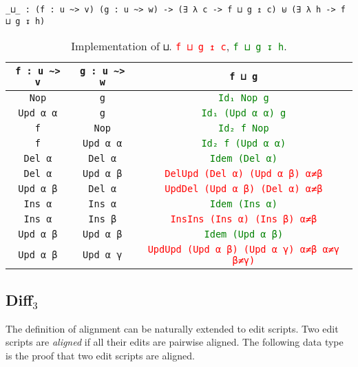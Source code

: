 \documentclass[../Thesis.tex]{subfiles}
\begin{document}
\begin{verbatim}
_⊔_ : (f : u ~> v) (g : u ~> w) -> (∃ λ c -> f ⊔ g ↥ c) ⊎ (∃ λ h -> f ⊔ g ↧ h)
\end{verbatim}
		
	\begin{table}[h]
	\centering
	\begin{tabular}{| c | c | c |}
	\hline
	\texttt{f : u \textasciitilde> v} & \texttt{g : u \textasciitilde> w} &  \texttt{f ⊔ g} 
	\\ \hline
	\texttt{Nop} & \texttt{g} & \textcolor{Green}{\texttt{Id₁ Nop g}} 
	\\ \hline
	\texttt{Upd α α} & \texttt{g} & \textcolor{Green}{\texttt{Id₁ (Upd α α) g}} 
	\\ \hline
	\texttt{f} & \texttt{Nop} & \textcolor{Green}{\texttt{Id₂ f Nop}} 
	\\ \hline
	\texttt{f} & \texttt{Upd α α} & \textcolor{Green}{\texttt{Id₂ f (Upd α α)}} 
	\\ \hline
	\texttt{Del α} & \texttt{Del α} & \textcolor{Green}{\texttt{Idem (Del α)}}
	\\ \hline
	\texttt{Del α} & \texttt{Upd α β} & \textcolor{Red}{\texttt{DelUpd (Del α) (Upd α β) α≠β}}
	\\ \hline
	\texttt{Upd α β} & \texttt{Del α} & \textcolor{Red}{\texttt{UpdDel (Upd α β) (Del α) α≠β}}
	\\ \hline
	\texttt{Ins α} & \texttt{Ins α} & \textcolor{Green}{\texttt{Idem (Ins α)}} 
	\\	\hline
	\texttt{Ins α} & \texttt{Ins β} & \textcolor{Red}{\texttt{InsIns (Ins α) (Ins β) α≠β}}
	\\	\hline
	\texttt{Upd α β} & \texttt{Upd α β} & \textcolor{Green}{\texttt{Idem (Upd α β)}}
	\\	\hline
	\texttt{Upd α β} & \texttt{Upd α γ} & \textcolor{Red}{\texttt{UpdUpd (Upd α β) (Upd α γ) α≠β α≠γ β≠γ)}}
	\\ \hline
	\end{tabular}
	\caption{Implementation of \texttt{⊔}. \textcolor{Red}{\texttt{f ⊔ g ↥ c}}, \textcolor{Green}{\texttt{f ⊔ g ↧ h}}.}
	\label{table:merge}
	\end{table}		

	\subsection{Diff$_3$}
	\label{subsec:Diff3}
	The definition of alignment can be naturally extended to edit scripts.
	Two edit scripts are \emph{aligned} if all their edits are pairwise aligned.	
	The following data type is the proof that two edit scripts are aligned.	
\end{document}
